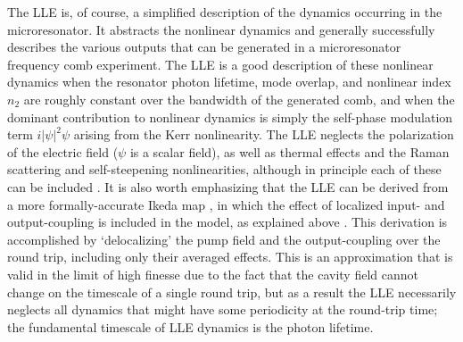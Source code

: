 The LLE is, of course, a simplified description of the dynamics occurring in the microresonator. It abstracts the nonlinear dynamics and generally successfully describes the various outputs that can be generated in a microresonator frequency comb experiment. The LLE is a good description of these nonlinear dynamics when the resonator photon lifetime, mode overlap, and nonlinear index $n_2$ are roughly constant over the bandwidth of the generated comb, and when the dominant contribution to nonlinear dynamics is simply the self-phase modulation term $i|\psi|^2\psi$ arising from the Kerr nonlinearity. The LLE neglects the polarization of the electric field ($\psi$ is a scalar field), as well as thermal effects and the Raman scattering and self-steepening nonlinearities, although in principle each of these can be included \cite{Hansson2018,Herr2014,Chembo2015,Agrawal2007}. It is also worth emphasizing that the LLE can be derived from a more formally-accurate Ikeda map \cite{Ikeda1979}, in which the effect of localized input- and output-coupling is included in the model, as explained above \cite{Coen2013a}. This derivation is accomplished by `delocalizing' the pump field and the output-coupling over the round trip, including only their averaged effects. This is an approximation that is valid in the limit of high finesse due to the fact that the cavity field cannot change on the timescale of a single round trip, but as a result the LLE necessarily neglects all dynamics that might have some periodicity at the round-trip time; the fundamental timescale of LLE dynamics is the photon lifetime. 





